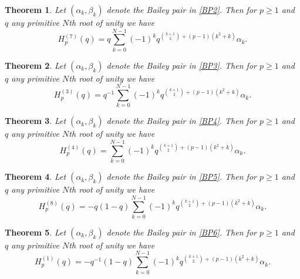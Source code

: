 \documentclass[11pt,reqno]{amsart}
\newtheorem{theorem}{Theorem}[section]
\theoremstyle{definition}
\numberwithin{equation}{section}
\renewcommand{\=}{\;=\;}
\begin{document}
\begin{theorem} \label{Baileyfamily2}
	Let $(\alpha_k,\beta_k)$ denote the Bailey pair in \eqref{BP2}.   Then for $p \geq 1$ and $q$ any primitive $N$th root of unity we have
	\begin{equation} \label{Baileyfamily2eq}
		H_p^{(7)}(q)  = q\sum_{k=0}^{N-1} (-1)^k q^{\binom{k+1}{2} +(p-1)(k^2+k)} \alpha_k.
	\end{equation} 
\end{theorem}

\begin{theorem} \label{Baileyfamily3} 
	Let $(\alpha_k,\beta_k)$ denote the Bailey pair in \eqref{BP3}.   Then for $p \geq 1$ and $q$ any primitive $N$th root of unity we have
	\begin{equation} \label{Baileyfamily3eq}
		H_p^{(3)}(q) = q^{-1}\sum_{k=0}^{N-1} (-1)^k q^{\binom{k+1}{2} +(p-1)(k^2+k)} \alpha_k.
	\end{equation} 
\end{theorem}

\begin{theorem} \label{Baileyfamily4} 
	Let $(\alpha_k,\beta_k)$ denote the Bailey pair in \eqref{BP4}.   Then for $p \geq 1$ and $q$ any primitive $N$th root of unity we have
	\begin{equation} \label{Baileyfamily4eq}
		H_p^{(4)}(q)  = \sum_{k=0}^{N-1} (-1)^k q^{\binom{k+1}{2} + (p-1)(k^2+k)} \alpha_k.
	\end{equation} 
\end{theorem}

\begin{theorem} \label{Baileyfamily5} 
	Let $(\alpha_k,\beta_k)$ denote the Bailey pair in \eqref{BP5}.   Then for $p \geq 1$ and $q$ any primitive $N$th root of unity we have
	\begin{equation} \label{Baileyfamily5eq}
		H_p^{(8)}(q) = -q(1-q)\sum_{k=0}^{N-1} (-1)^k q^{\binom{k+1}{2} +(p-1)(k^2+k)} \alpha_k.
	\end{equation} 
\end{theorem}

\begin{theorem} \label{Baileyfamily6}
	Let $(\alpha_k,\beta_k)$ denote the Bailey pair in \eqref{BP6}.   Then for $p \geq 1$ and $q$ any primitive $N$th root of unity we have
	\begin{equation} \label{Baileyfamily6eq}
		H_p^{(1)}(q)  = -q^{-1}(1-q)\sum_{k=0}^{N-1} (-1)^k q^{\binom{k+1}{2} +(p-1)(k^2+k)} \alpha_k.
	\end{equation} 
\end{theorem} 
\end{document}
